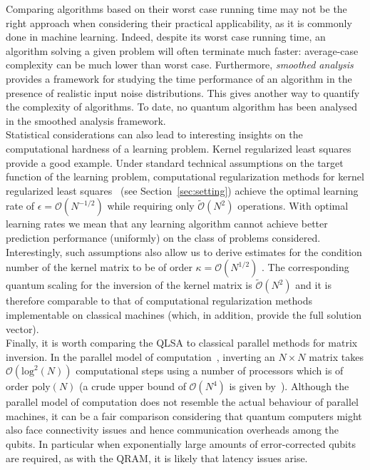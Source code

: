 \documentclass[a4paper, 11pt]{article}
\newcommand{\Ord}[1]{\mathcal{O}(#1)}
\newcommand{\tOrd}[1]{\tilde{\mathcal{O}}(#1)}
\begin{document}
Comparing algorithms based on their worst case running time may not be the right approach when considering their practical applicability, as it is commonly done in machine learning. Indeed, despite its worst case running time, an algorithm solving a given problem will often terminate much faster: average-case complexity can be much lower than worst case. Furthermore, \emph{smoothed analysis}~\cite{spielman2004smoothed, spielman2009smoothed} provides a framework for studying the time performance of an algorithm in the presence of realistic input noise distributions. This gives another way to quantify the complexity of algorithms. To date, no quantum algorithm has been analysed in the smoothed analysis framework.\\ 

Statistical considerations can also lead to interesting insights on the computational hardness of a learning problem. Kernel regularized least squares provide a good example. Under standard technical assumptions on the target function of the learning problem, computational regularization methods for kernel regularized least squares~\cite{bauer2007regularization,duchi2010,rudi2015less} (see Section~\ref{sec:setting}) achieve the optimal learning rate of $\epsilon = \Ord{N^{-1/2}}$ while requiring only $\tOrd{N^2}$ operations. With optimal learning rates we mean that any learning algorithm cannot achieve better prediction performance (uniformly) on the class of problems considered. Interestingly, such assumptions also allow us to derive estimates for the condition number of the kernel matrix to be of order $\kappa = \Ord{N^{1/2}}$ \cite{caponnetto2007}. The corresponding quantum scaling for the inversion of the kernel matrix is $\tOrd{N^2}$ and it is therefore comparable to that of computational regularization methods implementable on classical machines (which, in addition, provide the full solution vector).\\

Finally, it is worth comparing the QLSA to classical parallel methods for matrix inversion. In the parallel model of computation~\cite{heller1978survey}, inverting an $N\times N$ matrix takes $\Ord{\text{log}^2(N)}$ computational steps using a number of processors which is of order $\text{poly}(N)$ (a crude upper bound of $\Ord{N^4}$ is given by~\cite{csanky1976fast}). Although the parallel model of computation does not resemble the actual behaviour of parallel machines, it can be a fair comparison considering that quantum computers might also face connectivity issues and hence communication overheads among the qubits. In  particular when exponentially large amounts of error-corrected qubits are required, as with the QRAM, it is likely that latency issues arise.\\
\end{document}
